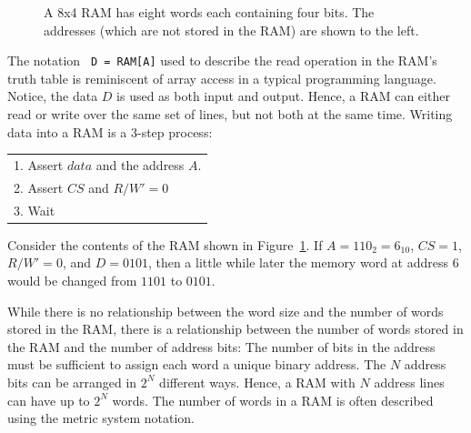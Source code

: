 \begin{figure}[ht]

\caption{A 8x4 RAM has eight words each containing four bits.  The addresses
(which are not stored in the RAM) are shown to the left.}
\label{fig:ram}

\end{figure}

The notation \verb^ D = RAM[A]^ used to describe the read operation
in the RAM's truth table is reminiscent of array access in a 
typical programming language.  Notice, the data 
$D$ is used as both input and output.  Hence, a RAM can either read 
or write over the same set of lines, but not both at the same time. 
Writing data into a RAM is a 3-step process:

\begin{tabular}{l}

1. Assert $data$ and the address $A$. \\
2. Assert $CS$ and $R/W'=0$ \\
3. Wait \\

\end{tabular}

Consider the contents of the RAM shown in Figure~\ref{fig:ram}.
If $A=110_2=6_{10}$, $CS=1$, $R/W'=0$, and $D=0101$, then a little while 
later the memory word at address 6 would be changed from $1101$ to
$0101$.  

While there is no relationship between the word size and the number of 
words stored in the RAM, there is a relationship between the number
of words stored in the RAM and the number of address bits:
The number of bits in the address must be sufficient to assign 
each word a unique binary address.  The $N$ address bits can be arranged 
in $2^N$ different ways.  Hence, a RAM with $N$ address lines can have 
up to $2^N$ words.  The number of words in a RAM is often described 
using the metric system notation.

